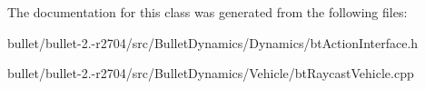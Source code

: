 The documentation for this class was generated from the following files\+:\begin{DoxyCompactItemize}
\item 
bullet/bullet-\/2.-\/r2704/src/\+Bullet\+Dynamics/\+Dynamics/bt\+Action\+Interface.\+h\item 
bullet/bullet-\/2.-\/r2704/src/\+Bullet\+Dynamics/\+Vehicle/bt\+Raycast\+Vehicle.\+cpp\end{DoxyCompactItemize}
